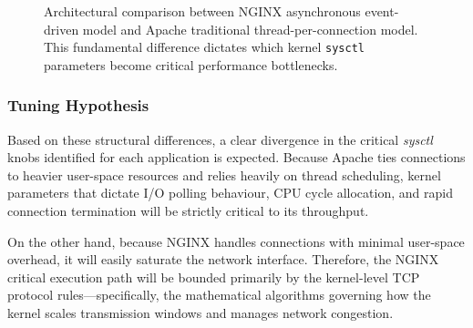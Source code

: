 \begin{figure}[htbp]
{
    }
    \caption{Architectural comparison between NGINX asynchronous event-driven model and Apache traditional thread-per-connection model. This fundamental difference dictates which kernel \texttt{sysctl} parameters become critical performance bottlenecks.}
    \label{fig:arch_comparison}
\end{figure}

\subsubsection{Tuning Hypothesis}

Based on these structural differences, a clear divergence in the critical \textit{sysctl} knobs identified for each application is expected.
Because Apache ties connections to heavier user-space resources and relies heavily on thread scheduling, kernel parameters that dictate I/O polling behaviour, CPU cycle allocation, and rapid connection termination will be strictly critical to its throughput.

On the other hand, because NGINX handles connections with minimal user-space overhead, it will easily saturate the network interface.
Therefore, the NGINX critical execution path will be bounded primarily by the kernel-level TCP protocol rules—specifically, the mathematical algorithms governing how the kernel scales transmission windows and manages network congestion.

